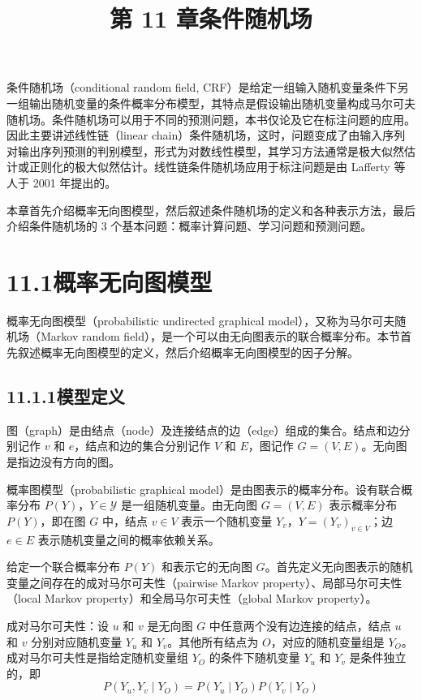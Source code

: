 \documentclass[UTF8, 12pt, fontset=fandol, oneside]{ctexart}
\title{第 11 章\quad 条件随机场}
\author{}
\date{}
\begin{document}
\maketitle

条件随机场（conditional random field, CRF）是给定一组输入随机变量条件下另一组输出随机变量的条件概率分布模型，其特点是假设输出随机变量构成马尔可夫随机场。条件随机场可以用于不同的预测问题，本书仅论及它在标注问题的应用。因此主要讲述线性链（linear chain）条件随机场，这时，问题变成了由输入序列对输出序列预测的判别模型，形式为对数线性模型，其学习方法通常是极大似然估计或正则化的极大似然估计。线性链条件随机场应用于标注问题是由 Lafferty 等人于 2001 年提出的。

本章首先介绍概率无向图模型，然后叙述条件随机场的定义和各种表示方法，最后介绍条件随机场的 3 个基本问题：概率计算问题、学习问题和预测问题。

\section*{11.1\quad 概率无向图模型}

概率无向图模型（probabilistic undirected graphical model），又称为马尔可夫随机场（Markov random field），是一个可以由无向图表示的联合概率分布。本节首先叙述概率无向图模型的定义，然后介绍概率无向图模型的因子分解。

\subsection*{11.1.1\quad 模型定义}

图（graph）是由结点（node）及连接结点的边（edge）组成的集合。结点和边分别记作 $v$ 和 $e$，结点和边的集合分别记作 $V$ 和 $E$，图记作 $G=(V,E)$。无向图是指边没有方向的图。

概率图模型（probabilistic graphical model）是由图表示的概率分布。设有联合概率分布 $P(Y)$，$Y\in\mathcal{Y}$ 是一组随机变量。由无向图 $G=(V,E)$ 表示概率分布 $P(Y)$，即在图 $G$ 中，结点 $v\in V$ 表示一个随机变量 $Y_v$，$Y=(Y_v)_{v\in V}$；边 $e\in E$ 表示随机变量之间的概率依赖关系。

给定一个联合概率分布 $P(Y)$ 和表示它的无向图 $G$。首先定义无向图表示的随机变量之间存在的成对马尔可夫性（pairwise Markov property）、局部马尔可夫性（local Markov property）和全局马尔可夫性（global Markov property）。

成对马尔可夫性：设 $u$ 和 $v$ 是无向图 $G$ 中任意两个没有边连接的结点，结点 $u$ 和 $v$ 分别对应随机变量 $Y_u$ 和 $Y_v$。其他所有结点为 $O$，对应的随机变量组是 $Y_O$。成对马尔可夫性是指给定随机变量组 $Y_O$ 的条件下随机变量 $Y_u$ 和 $Y_v$ 是条件独立的，即
\begin{equation}
P(Y_u,Y_v\mid Y_O)=P(Y_u\mid Y_O)P(Y_v\mid Y_O)
\tag{11.1}
\end{equation}
\end{document}

